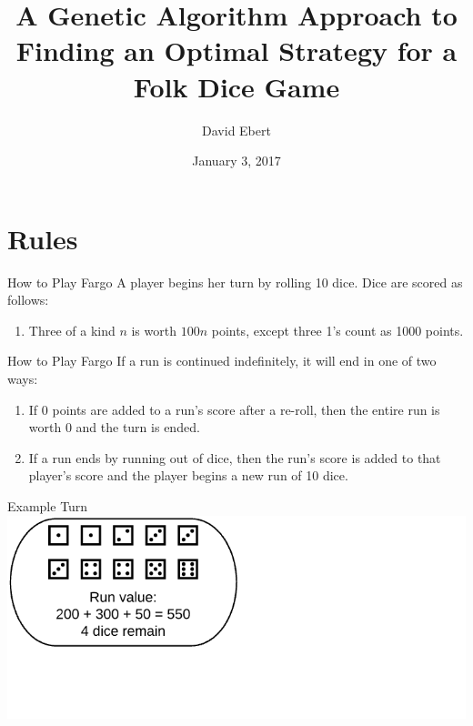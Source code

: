 \documentclass{beamer}
\title{A Genetic Algorithm Approach to Finding an Optimal Strategy for a Folk Dice Game}
\date{January 3, 2017}
\author{David Ebert}
\institute{Tarleton State University}
\begin{document}
\maketitle

\section{Rules}
  \begin{frame}{How to Play Fargo}
  A player begins her turn by rolling 10 dice. Dice are scored as follows:
  \begin{enumerate}
  \item Three of a kind $n$ is worth $100n$ points, except three 1's count as 1000 points.
  \end{enumerate}
  \vspace{15 pt}
  \end{frame}

  \begin{frame}{How to Play Fargo}
  If a run is continued indefinitely, it will end in one of two ways:
  \begin{enumerate}
  \item If 0 points are added to a run's score after a re-roll, then the entire run is worth 0 and the turn is ended.
  \item If a run ends by running out of dice, then the run's score is added to that player's score and the player begins a new run of 10 dice.
  \end{enumerate}
  \end{frame}

  \begin{frame}{Example Turn}
  \centering
  \includegraphics[width = \textwidth]{turn1_1.png}
  \end{frame}
\end{document}
